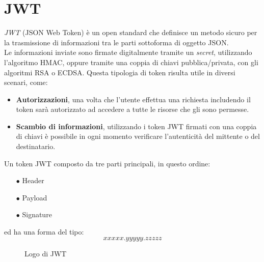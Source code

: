 \section{JWT}\label{sec:jwt}
\emph{JWT} (JSON Web Token) è un open standard che definisce un metodo sicuro per la trasmissione di informazioni tra le parti sottoforma di oggetto JSON.\\
Le informazioni inviate sono firmate digitalmente tramite un \emph{secret}, utilizzando l’algoritmo HMAC, oppure tramite una coppia di chiavi pubblica/privata, con gli algoritmi RSA o ECDSA.
Questa tipologia di token risulta utile in diversi scenari, come:
\begin{itemize}
	\item \textbf{Autorizzazioni}, una volta che l’utente effettua una richiesta includendo il token sarà autorizzato ad accedere a tutte le risorse che gli sono permesse.
	\item \textbf{Scambio di informazioni}, utilizzando i token JWT firmati con una coppia di chiavi è possibile in ogni momento verificare l’autenticità del mittente o del destinatario.
\end{itemize}

Un token JWT composto da tre parti principali, in questo ordine:
\begin{itemize}
	\item[$\bullet$]Header
	\item[$\bullet$]Payload
	\item[$\bullet$]Signature
\end{itemize}
ed ha una forma del tipo:
\[ xxxxx.yyyyy.zzzzz \]
\begin{figure}[ht]
	\centering
	\caption{Logo di JWT}
	\label{fig:one}
\end{figure}


